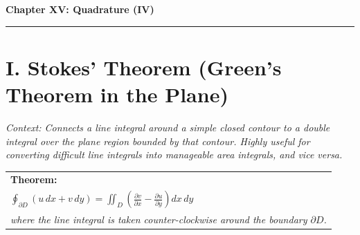 \documentclass[11pt, a4paper]{article}
\begin{document}
\vspace{0.3cm}

\newpage

\begin{center}
    {\LARGE \bfseries \color{accent} Chapter XV: Quadrature (IV)}\\
    \vspace{0.2cm}
    {\color{accent}\rule{0.55\linewidth}{0.8pt}}
\end{center}
\vspace{0.35cm}

\begin{center}
\end{center}


\section*{\color{primary} I. Stokes' Theorem (Green's Theorem in the Plane)}

\textit{\small Context: Connects a line integral around a simple closed contour to a double integral over the plane region bounded by that contour. Highly useful for converting difficult line integrals into manageable area integrals, and vice versa.}

\begin{center}
\begin{tabular}{@{}p{}@{}}
\toprule
\textbf{\color{accent}Theorem:} \\
$\displaystyle \oint_{\partial D} (u \, dx + v \, dy) = \iint_D \left( \frac{\partial v}{\partial x} - \frac{\partial u}{\partial y} \right) dx \, dy$ \\
\textit{\small where the line integral is taken counter-clockwise around the boundary $\partial D$.} \\
\bottomrule
\end{tabular}
\end{center}

\vspace{0.3cm}
\end{document}
